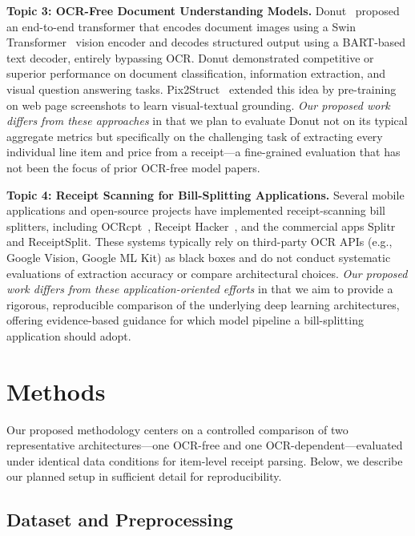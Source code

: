 \documentclass[9pt,twocolumn,twoside]{extarticle}
\begin{document}
\smallskip\noindent\textbf{Topic 3: OCR-Free Document Understanding Models.}
Donut~\cite{kim2022donut} proposed an end-to-end transformer that encodes document images using a Swin Transformer~\cite{liu2021swin} vision encoder and decodes structured output using a BART-based text decoder, entirely bypassing OCR. Donut demonstrated competitive or superior performance on document classification, information extraction, and visual question answering tasks. Pix2Struct~\cite{lee2023pix2struct} extended this idea by pre-training on web page screenshots to learn visual-textual grounding. \emph{Our proposed work differs from these approaches} in that we plan to evaluate Donut not on its typical aggregate metrics but specifically on the challenging task of extracting every individual line item and price from a receipt---a fine-grained evaluation that has not been the focus of prior OCR-free model papers.

\smallskip\noindent\textbf{Topic 4: Receipt Scanning for Bill-Splitting Applications.}
Several mobile applications and open-source projects have implemented receipt-scanning bill splitters, including OCRcpt~\cite{ocrcpt}, Receipt Hacker~\cite{receipthacker}, and the commercial apps Splitr and ReceiptSplit. These systems typically rely on third-party OCR APIs (e.g., Google Vision, Google ML Kit) as black boxes and do not conduct systematic evaluations of extraction accuracy or compare architectural choices. \emph{Our proposed work differs from these application-oriented efforts} in that we aim to provide a rigorous, reproducible comparison of the underlying deep learning architectures, offering evidence-based guidance for which model pipeline a bill-splitting application should adopt.

\section{Methods}
\label{sec:methods}

Our proposed methodology centers on a controlled comparison of two representative architectures---one OCR-free and one OCR-dependent---evaluated under identical data conditions for item-level receipt parsing. Below, we describe our planned setup in sufficient detail for reproducibility.

\subsection{Dataset and Preprocessing}
\label{sec:data}
\end{document}
